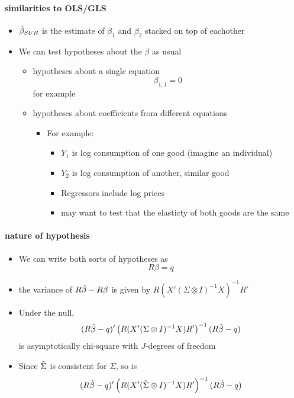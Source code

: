 \paragraph{similarities to OLS/GLS}
\begin{itemize}
\item $\hat{\beta}_{SUR}$ is the estimate of $\beta_1$ and $\beta_2$
        stacked on top of eachother
\item We can test hypotheses about the $\beta$ as usual
\begin{itemize}
\item hypotheses about a single equation
          \[ \beta_{1,1} = 0 \]
          for example
\item hypotheses about coefficients from different equations
\begin{itemize}
\item For example:
\begin{itemize}
\item $Y_1$ is log consumption of one good (imagine an individual)
\item $Y_2$ is log consumption of another, similar good
\item Regressors include log prices
\item may want to test that the elasticty of both goods are
              the same
\end{itemize}
\end{itemize}
\end{itemize}
\end{itemize}

\paragraph{nature of hypothesis}
\begin{itemize}
\item We can write both sorts of hypotheses as
        \[ R \beta = q \]
\item the variance of $R\hat{\beta} - R\beta$ is given by $R(X'(\Sigma \otimes I)^{-1}X)^{-1}R'$
\item Under the null, 
  \[(R\hat{\beta} - q)'\left(R(X'(\Sigma \otimes I)^{-1}X)R'\right)^{-1}(R\hat{\beta} - q)\]
  is asymptotically chi-square with $J$-degrees of freedom
\item Since $\hat{\Sigma}$ is consistent for $\Sigma$, so is
  \[(R\hat{\beta} - q)'\left(R(X'(\hat{\Sigma} \otimes I)^{-1}X)R'\right)^{-1}(R\hat{\beta} - q)\]
\end{itemize}

